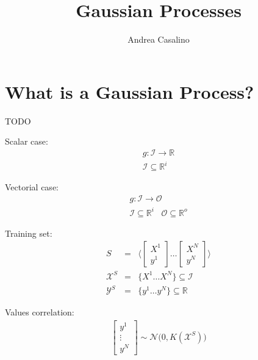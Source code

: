 \documentclass{article}
\author{Andrea Casalino}
\title{Gaussian Processes}
\begin{document}
\maketitle

\newpage
\section{What is a Gaussian Process?}

TODO

Scalar case:
\begin{eqnarray}
g : \mathcal{I} \rightarrow \mathbb{R} \\
\mathcal{I} \subseteq \mathbb{R}^i
\end{eqnarray}

Vectorial case:
\begin{eqnarray}
g : \mathcal{I} \rightarrow \mathcal{O} \\
\mathcal{I} \subseteq \mathbb{R}^i \,\,\,\,\, \mathcal{O} \subseteq \mathbb{R}^o 
\end{eqnarray}

Training set:
\begin{eqnarray}
S &=& 
\bigg \langle 
\begin{bmatrix} X^1 \\ y^1 \end{bmatrix}
\hdots
\begin{bmatrix} X^N \\ y^N \end{bmatrix} 
\bigg \rangle \\
\mathcal{X}^S &=& \big \lbrace X^1 \hdots X^N \big \rbrace \subseteq \mathcal{I} \\
\mathcal{Y}^S &=& \big \lbrace y^1 \hdots y^N \big \rbrace \subseteq \mathbb{R}
\end{eqnarray}

Values correlation:
\begin{eqnarray}
\begin{bmatrix} y^1 \\ \vdots \\ y^N \end{bmatrix} \sim \mathcal{N} 
\bigg (
0, K(\mathcal{X}^S)
\bigg ) 
\end{eqnarray}
\end{document}
